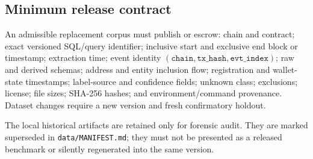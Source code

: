 \subsection{Minimum release contract}

An admissible replacement corpus must publish or escrow: chain and contract;
exact versioned SQL/query identifier; inclusive start and exclusive end block
or timestamp; extraction time; event identity $(\texttt{chain},
\texttt{tx\_hash},\texttt{evt\_index})$; raw and derived schemas; address and
entity inclusion flow; registration and wallet-state timestamps; label-source
and confidence fields; unknown class; exclusions; license; file sizes; SHA-256
hashes; and environment/command provenance.  Dataset changes require a new
version and fresh confirmatory holdout.

The local historical artifacts are retained only for forensic audit.  They are
marked superseded in \texttt{data/MANIFEST.md}; they must not be presented as a
released benchmark or silently regenerated into the same version.
